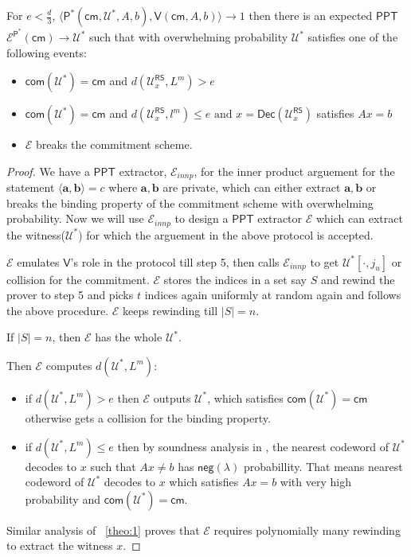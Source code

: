 \documentclass[runningheads]{llncs}
\newcommand{\innp}[2]{\langle #1,#2\rangle}
\def\ppt{\mathsf{PPT}}
\def\extrac{\mathcal{E}}
\def\prover{\mathsf{P}}
\def\verifier{\mathsf{V}}
\def\RS{\mathsf{RS}} %
\def\cm{\mathsf{cm}} %
\def\com{\mathsf{com}} %
\def\negl{\mathsf{neg}}
\def\oracle{\mathcal{U}^{\RS}}
\def\dec{\mathsf{Dec}}
\def\calU{\mathcal{U}}
\begin{document}
	\begin{theorem}
		For $e < \frac{d}{3} $, $\innp{\prover^*(\cm, \calU^*, A, b)}{\verifier(\cm, A, b)} \rightarrow 1 $ then there is an expected $\ppt$ $\extrac^{\prover^*}(\cm) \rightarrow \calU^*$ such that with overwhelming probability $\calU^*$ satisfies one of the following events:
		\begin{itemize}
			\item $\com(\calU^*)=\cm$ and $d(\oracle_x,L^m) > e $
			\item $\com(\calU^*)=\cm$ and $d(\oracle_x, l^m)\leq e \text{ and } x = \dec(\oracle_x)$ satisfies $ Ax = b$
			\item $\extrac$ breaks the commitment scheme.
		\end{itemize}
	\end{theorem}

	\begin{proof}
	We have a $\ppt$ extractor, $\extrac_{innp}$, for the inner product arguement for the statement $\innp{\bm{a}}{\bm{b}}=c$ where $\bm{a},\bm{b}$ are private, which can either extract $\bm{a}, \bm{b}$ or breaks the binding property of the commitment scheme with overwhelming probability. Now we will use $\extrac_{innp}$ to design a $\ppt$ extractor $\extrac$ which can extract the witness($\calU^*$) for which the arguement in the above protocol is accepted.
	
	 $\extrac$ emulates $\verifier$'s role in the protocol till step 5, then calls $\extrac_{innp}$ to get $\calU^*[\cdot,j_u]$ or collision for the commitment. $\extrac$ stores the indices in a set say $S$ and rewind the prover to step 5 and picks $t$ indices again uniformly at random again and follows the above procedure. $\extrac$ keeps rewinding till $|S|=n$.
	 
	 If $|S|=n$, then $\extrac$ has the whole $\calU^*$.
	 
	 Then $\extrac$ computes $d(\calU^*, L^m)$:
	 \begin{itemize}
	 	\item if $d(\calU^*,L^m) > e$ then $\extrac$ outputs $\calU^*$, which satisfies $\com(\calU^*)=\cm$ otherwise gets a collision for the binding property.
	 	
	 	\item if $d(\calU^*,L^m) \leq e$ then by soundness analysis in \cite{Ligero2017}, the nearest codeword of $\calU^*$ decodes to $x$ such that $Ax\neq b$ has $\negl(\lambda)$ probabillity. That means nearest codeword of $\calU^*$ decodes to $x$ which satisfies $Ax=b$ with very high probability and $\com(\calU^*)=\cm$.
	 \end{itemize}
 
	 Similar analysis of ~\ref{theo:1} proves that $\extrac$ requires polynomially many rewinding to extract the witness $x$.
	\end{proof}
\end{document}
